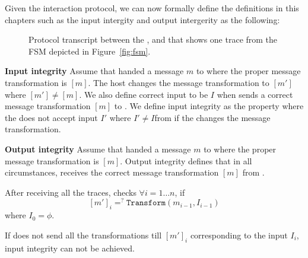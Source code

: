 Given the interaction protocol, we can now formally define the definitions in this chapters such as the input intergity and output intergerity as the following:

\begin{figure}[t]
\begin{center}
\begin{sequencediagram}
\end{sequencediagram}
\end{center}
\caption[\name protocol transcript]{Protocol transcript between the \server, \user and \host that shows one trace from the FSM depicted in Figure~\ref{fig:fsm}.}
\label{fig:protocol}
\end{figure}


\begin{definition}{\textbf{Input integrity}}
\label{def:inputIntegrity}
Assume that \server handed a message $m$ to \host where the proper message transformation is $[m]$. The host changes the message transformation to $[m']$ where $[m']\neq [m]$. We also define correct \user input to be $I$ when \host sends a correct message transformation $[m]$ to \user. We define input integrity as the property where the \server does not accept input $I'$ where $I'\neq I$from \user if the \host changes the message transformation.
\end{definition}

\begin{definition}{\textbf{Output integrity}}
\label{def:outputIntegrity}
Assume that \server handed a message $m$ to \host where the proper message transformation is $[m]$. Output integrity defines that in all circumstances, \user receives the correct message transformation $[m]$ from \host.
\end{definition}

 After receiving all the traces, \server checks $\forall i=1\ldots n$, if $$[m']_i =^? \texttt{Transform}(m_{i-1}, I_{i-1})$$ where $I_0=\phi$.

\begin{lemma}
\label{theorem:th1}
If \user does not send all the transformations till $[m']_i$ corresponding to the input $I_i$, input integrity can not be achieved. 
\end{lemma}

